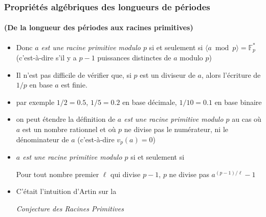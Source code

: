 \documentclass[10pt,handout]{beamer} %
\newcommand{\F}{\mathbb F}
\theoremstyle{definition}
\begin{document}
\begin{frame}
 \frametitle{Propri\'et\'es alg\'ebriques des longueurs de p\'eriodes }
\framesubtitle{(De la longueur des p\'eriodes aux racines primitives)}

\begin{itemize}[<+-|alert@+>]
\item Donc \emph{$a$ est une racine primitive modulo $p$} si et seulement si $\langle a\bmod p\rangle=\F_p^*$\\ (c'est-\`a-dire
s'il y a $p-1$ puissances distinctes de $a$ modulo $p$)
\item 
Il n'est pas difficile de v\'erifier que, si
$p$ est un diviseur de $a$, alors l'\'ecriture de $1/p$ en base $a$ est finie.
\item par exemple $1/2=0.5$, \quad $1/5=0.2$ en base d\'ecimale, $1/10=0.1$ en base binaire
\item on peut \'etendre la d\'efinition de \emph{$a$ est une racine primitive modulo $p$}  au cas o\`u $a$ est un nombre rationnel
 et o\`u $p$ ne divise pas le num\'erateur, ni le d\'enominateur de $a$ (c'est-\`a-dire $v_p(a)=0$)
\item \emph{$a$ est une racine primitive modulo $p$} si et seulement si\medskip

Pour tout nombre premier $\ell$ qui divise $p-1$,
$p$ ne divise pas $a^{(p-1)/\ell}-1$
\item C'\'etait l'intuition d'Artin sur la\medskip

\centerline{ \emph{Conjecture des Racines Primitives}}
\end{itemize}
\end{frame}
\end{document}
